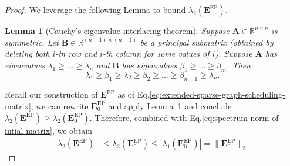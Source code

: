 \documentclass[lettersize,journal]{IEEEtran}
\newcommand{\GEP}{\boldsymbol{E}^{\mathrm{EP}}}
\newcommand{\RR}{\mathbb{R}}
\newtheorem{lemma}{Lemma}
\begin{document}
\begin{proof}
We leverage the following Lemma to bound $\lambda_2(\GEP)$.
\begin{lemma} [Cauchy's eigenvalue interlacing theorem{\cite[Theorem 4.3.15]{Horn_Johnson_1985}}]
\label{lem:eigenvalue-interlacing-theorem}
Suppose $\boldsymbol{A}\in \RR^{n\times n}$ is symmetric. Let $\boldsymbol{B}\in \RR^{{(n-1
)}\times {(n-1)}}$ be a principal submatrix (obtained by deleting both $i$-th row and $i$-th column for some values of $i$). Suppose $\boldsymbol{A}$ has eigenvalues $\lambda_1\geq \dots \geq \lambda_n$ and $\boldsymbol{B}$ has eigenvalues $\beta_1\geq \dots \geq \beta_m$. 
Then
\[
    \lambda_1 \geq \beta_1 \geq \lambda_2 \geq \beta_2 \geq \dots \geq \beta_{n-1}\geq \lambda_n.
\]
\end{lemma}
Recall our construction of $\GEP$ as of Eq.\eqref{eq:extended-sparse-graph-scheduling-matrix}, we can rewrite $\GEP_0$ and apply Lemma~\ref{lem:eigenvalue-interlacing-theorem} and conclude $\lambda_2(\GEP) \geq \lambda_2(\GEP_0).$
Therefore, combined with Eq.\eqref{eq:spectrum-norm-of-intial-matrix}, we obtain
\begin{align}
 \label{eq:the-second-largest-eigenvalue-of-sparse-graph-scheudling-matrix}
    \lambda_2(\GEP) &\leq \lambda_2(\GEP_0) \leq |\lambda_1(\GEP_0)| =  \|\GEP_0\|_2
\end{align}


\end{proof}
\end{document}
